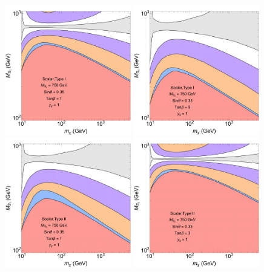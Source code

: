 \begin{figure}[ht]
\begin{center}
\includegraphics[width=0.49\textwidth]{texinputs/06_comparisons/figures/S_TI_TB1.pdf}
\includegraphics[width=0.49\textwidth]{texinputs/06_comparisons/figures/S_TI_TB5.pdf}\\
\includegraphics[width=0.49\textwidth]{texinputs/06_comparisons/figures/S_TII_TB1.pdf}
\includegraphics[width=0.49\textwidth]{texinputs/06_comparisons/figures/S_TII_TB3.pdf}

\end{center}
\end{figure}

